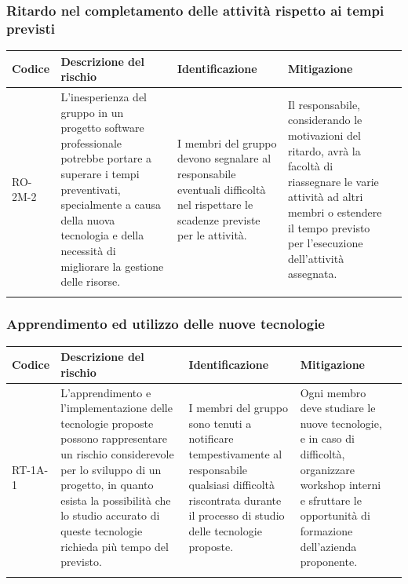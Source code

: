 \documentclass{article}
\begin{document}
\subsubsection{Ritardo nel completamento delle attività rispetto ai tempi previsti}
\begin{table}[h]
    \centering
    \begin{tabularx}{\textwidth}{l>{\RaggedRight}X>{\RaggedRight}X>{\RaggedRight}X>{\RaggedRight}X}
    \toprule
    \rowcolor{gray!50}
    \textbf{Codice} & \textbf{Descrizione del rischio} & \textbf{Identificazione} & \textbf{Mitigazione} \\
    \midrule
    \addlinespace 
    RO-2M-2 & 
    L'inesperienza del gruppo in un progetto software professionale potrebbe portare a superare i tempi preventivati, specialmente a causa della nuova tecnologia e della necessità di migliorare la gestione delle risorse.& 
    I membri del gruppo devono segnalare al responsabile eventuali difficoltà nel rispettare le scadenze previste per le attività. &
    Il responsabile, considerando le motivazioni del ritardo, avrà la facoltà di riassegnare le varie attività ad altri membri o estendere il tempo previsto per l'esecuzione dell'attività assegnata. \\
    \bottomrule
    \addlinespace 
    \end{tabularx}
\end{table}


\subsubsection{Apprendimento ed utilizzo delle nuove tecnologie} \label{sec:rischioTec}
\begin{table}[h]
    \centering
    \begin{tabularx}{\textwidth}{l>{\RaggedRight}X>{\RaggedRight}X>{\RaggedRight}X>{\RaggedRight}X}
    \toprule
    \rowcolor{gray!50}
    \textbf{Codice} & \textbf{Descrizione del rischio} & \textbf{Identificazione} & \textbf{Mitigazione} \\
    \midrule
    \addlinespace 
    RT-1A-1 & 
    L’apprendimento e l'implementazione delle tecnologie proposte possono rappresentare un rischio considerevole per lo  sviluppo di un progetto, in quanto esista la possibilità che lo studio accurato di queste tecnologie richieda più tempo del previsto.& 
    I membri del gruppo sono tenuti a notificare tempestivamente al responsabile qualsiasi difficoltà riscontrata durante il processo di studio delle tecnologie proposte. &
    Ogni membro deve studiare le nuove tecnologie, e in caso di difficoltà, organizzare workshop interni e sfruttare le opportunità di formazione dell'azienda proponente. \\
    \bottomrule
    \addlinespace 
    \end{tabularx}
\end{table}
\end{document}
